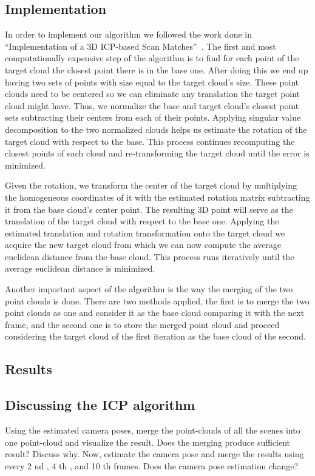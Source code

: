 \subsection{Implementation}
In order to implement our algorithm we followed the work done in ``Implementation of a 3D ICP-based Scan Matches''~\cite{icpImp}. The first and most computationally expensive step of the algorithm is to find for each point of the target cloud the closest point there is in the base one. After doing this we end up having two sets of points with size equal to the target cloud's size. These point clouds need to be centered so we can eliminate any translation the target point cloud might have. Thus, we normalize the base and target cloud's closest point sets subtracting their centers from each of their points. Applying singular value decomposition to the two normalized clouds helps us estimate the rotation of the target cloud with respect to the base. This process continues recomputing the closest points of each cloud and re-transforming the target cloud until the error is minimized.

Given the rotation, we transform the center of the target cloud by multiplying the homogeneous coordinates of it with the estimated rotation matrix subtracting it from the base cloud's center point. The resulting 3D point will serve as the translation of the target cloud with respect to the base one. Applying the estimated translation and rotation transformation onto the target cloud we acquire the new target cloud from which we can now compute the average euclidean distance from the base cloud. This process runs iteratively until the average euclidean distance is minimized.

Another important aspect of the algorithm is the way the merging of the two point clouds is done. There are two methods applied, the first is to merge the two point clouds as one and consider it as the base cloud comparing it with the next frame, and the second one is to store the merged point cloud and proceed considering the target cloud of the first iteration as the base cloud of the second.


\subsection{Results}


\subsection{Discussing the ICP algorithm}
Using the estimated camera poses, merge the point-clouds of all the scenes into one point-cloud and visualize the result. Does the merging produce sufficient result? Discuss why. Now, estimate the camera pose and merge the results using every 2 nd , 4 th , and 10 th frames. Does the camera pose estimation change?


